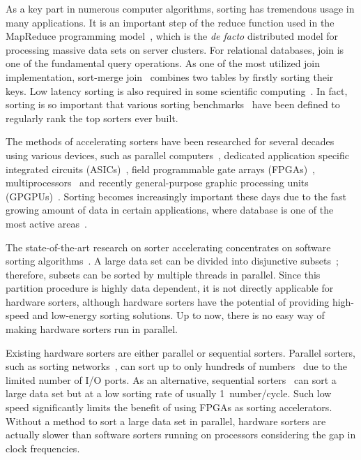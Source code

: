 \documentclass[10pt, conference]{IEEEtran}
\begin{document}
As a key part in numerous computer algorithms, sorting has tremendous usage in many applications.
It is an important step of the reduce function used in the MapReduce programming model~\cite{Dean2008},
which is the \emph{de facto} distributed model for processing massive data sets on server clusters.
For relational databases, join is one of the fundamental query operations.
As one of the most utilized join implementation, sort-merge join~\cite{Mishra1992} combines two tables by firstly sorting their keys.
Low latency sorting is also required in some scientific computing~\cite{Farmahini-Farahani2011}.
In fact, sorting is so important that various sorting benchmarks~\cite{SortBenchmark} have been defined to regularly rank the top sorters ever built.


The methods of accelerating sorters have been researched for several decades using various devices,
such as parallel computers~\cite{Cole1988}, dedicated application specific integrated circuits (ASICs)~\cite{Arisland1984, Tsuda1987, Farmahini-Farahani2013},
field programmable gate arrays (FPGAs)~\cite{Marcelino2009, Koch2011, Mueller2012, Casper2014},
multiprocessors~\cite{Gedik2007,Chhugani2008,Odeh2012} and recently general-purpose graphic processing units (GPGPUs)~\cite{Govindaraju2006, Satish2009}.
Sorting becomes increasingly important these days due to the fast growing amount of data in certain applications,
where database is one of the most active areas~\cite{Mueller2012, Casper2014}.


The state-of-the-art research on sorter accelerating concentrates on software sorting algorithms~\cite{SortBenchmark}.
A large data set can be divided into disjunctive subsets~\cite{Odeh2012}; therefore, subsets can be sorted by multiple threads in parallel.
Since this partition procedure is highly data dependent, it is not directly applicable for hardware sorters,
although hardware sorters have the potential of providing high-speed and low-energy sorting solutions.
Up to now, there is no easy way of making hardware sorters run in parallel. %


Existing hardware sorters are either parallel or sequential sorters.
Parallel sorters, such as sorting networks~\cite{Batcher1968}, 
can sort up to only hundreds of numbers~\cite{Farmahini-Farahani2013} due to the limited number of I/O ports.
As an alternative, sequential sorters~\cite{Bitton1984} can sort a large data set but at a low sorting rate of usually 1~number/cycle.
Such low speed significantly limits the benefit of using FPGAs as sorting accelerators. %
Without a method to sort a large data set in parallel, hardware sorters are actually slower than software sorters running on processors considering the gap in clock frequencies.
\end{document}
